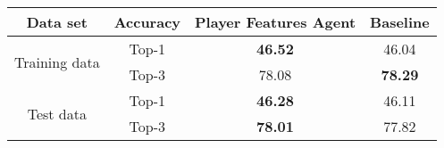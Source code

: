     
    \begin{tabular}{c c c c }
    \toprule
    
    Data set & Accuracy & Player Features Agent & Baseline \\
    
    \midrule
    \multirow{2}{7em}{Training data} & Top-1 & \textbf{46.52} & 46.04 \\
    & Top-3 & 78.08 & \textbf{78.29} \\
    \hline
    \multirow{2}{7em}{Test data} & Top-1 & \textbf{46.28} & 46.11 \\
    & Top-3 & \textbf{78.01} & 77.82 \\
    \bottomrule
        
    \end{tabular}